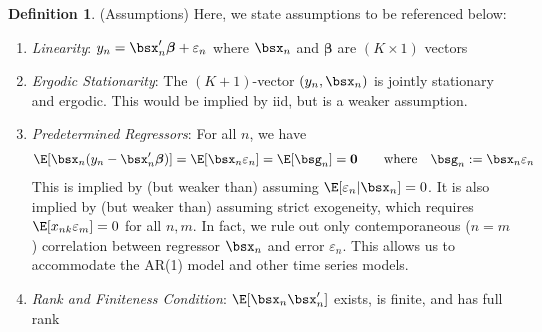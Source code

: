 \documentclass[12pt]{article}
\theoremstyle{plain}
\theoremstyle{definition}
\newtheorem{defn}[thm]{Definition}
\theoremstyle{remark}
\newcommand{\bsSigma}{\boldsymbol{\Sigma}}
\newcommand{\bsbeta}{\boldsymbol{\beta}}
\renewcommand{\bso}{\boldsymbol{0}}
\begin{document}
\begin{defn}(Assumptions)
Here, we state assumptions to be referenced below:
\begin{enumerate}
  \item \emph{Linearity}: $y_n = \bsx_n' \bsbeta + \varepsilon_n$
    where $\bsx_n$ and $\bsbeta$ are $(K\times 1)$ vectors
  \item \emph{Ergodic Stationarity}:
    The $(K+1)$-vector $(y_n, \bsx_n)$ is jointly stationary and
    ergodic. This would be implied by iid, but is a weaker assumption.

  \item \emph{Predetermined Regressors}:
    For all $n$, we have
    \begin{align*}
      \E[\bsx_n (y_n - \bsx'_n \bsbeta)]=\E[\bsx_n \varepsilon_n] =
      \E[\bsg_n]= \bso
      \qquad
      \text{where}\quad
      \bsg_n := \bsx_n\varepsilon_n
    \end{align*}
    This is implied by (but weaker than) assuming
    $\E[\varepsilon_n|\bsx_n]=0$.  It is also implied by (but weaker
    than) assuming strict exogeneity, which requires
    $\E[x_{nk}\varepsilon_m]=0$
    for all $n,m$.  In fact, we rule out only contemporaneous ($n=m$)
    correlation between regressor $\bsx_n$ and error $\varepsilon_n$.
    This allows us to accommodate the AR(1) model and other time series
    models.

  \item \emph{Rank and Finiteness Condition}:
    $\E[\bsx_n\bsx_n']$ exists, is finite, and has full rank


\end{enumerate}
\end{defn}
\end{document}
